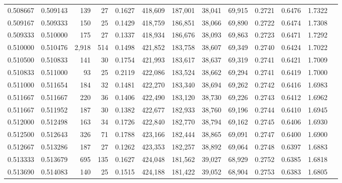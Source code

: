 \begin{tabular}{rrrrrrrrrrrrr}
0.508667 & 0.509143 &   139 &  27 &                                     0.1627 & 418,609 & 187,001 &  38,041 &  69,915 & 0.2721 & 0.6476 & 1.7322 \\
0.509167 & 0.509333 &   150 &  25 &                                     0.1429 & 418,759 & 186,851 &  38,066 &  69,890 & 0.2722 & 0.6474 & 1.7308 \\
0.509333 & 0.510000 &   175 &  27 &                                     0.1337 & 418,934 & 186,676 &  38,093 &  69,863 & 0.2723 & 0.6471 & 1.7292 \\
0.510000 & 0.510476 & 2,918 & 514 &                                     0.1498 & 421,852 & 183,758 &  38,607 &  69,349 & 0.2740 & 0.6424 & 1.7022 \\
0.510500 & 0.510833 &   141 &  30 &                                     0.1754 & 421,993 & 183,617 &  38,637 &  69,319 & 0.2741 & 0.6421 & 1.7009 \\
0.510833 & 0.511000 &    93 &  25 &                                     0.2119 & 422,086 & 183,524 &  38,662 &  69,294 & 0.2741 & 0.6419 & 1.7000 \\
0.511000 & 0.511654 &   184 &  32 &                                     0.1481 & 422,270 & 183,340 &  38,694 &  69,262 & 0.2742 & 0.6416 & 1.6983 \\
0.511667 & 0.511667 &   220 &  36 &                                     0.1406 & 422,490 & 183,120 &  38,730 &  69,226 & 0.2743 & 0.6412 & 1.6962 \\
0.511667 & 0.511952 &   187 &  30 &                                     0.1382 & 422,677 & 182,933 &  38,760 &  69,196 & 0.2744 & 0.6410 & 1.6945 \\
0.512000 & 0.512498 &   163 &  34 &                                     0.1726 & 422,840 & 182,770 &  38,794 &  69,162 & 0.2745 & 0.6406 & 1.6930 \\
0.512500 & 0.512643 &   326 &  71 &                                     0.1788 & 423,166 & 182,444 &  38,865 &  69,091 & 0.2747 & 0.6400 & 1.6900 \\
0.512667 & 0.513286 &   187 &  27 &                                     0.1262 & 423,353 & 182,257 &  38,892 &  69,064 & 0.2748 & 0.6397 & 1.6883 \\
0.513333 & 0.513679 &   695 & 135 &                                     0.1627 & 424,048 & 181,562 &  39,027 &  68,929 & 0.2752 & 0.6385 & 1.6818 \\
0.513690 & 0.514083 &   140 &  25 &                                     0.1515 & 424,188 & 181,422 &  39,052 &  68,904 & 0.2753 & 0.6383 & 1.6805 \\

\end{tabular}
